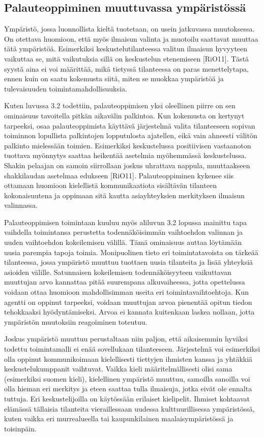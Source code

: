 \documentclass[finnish]{tktltiki2}
\theoremstyle{definition}
\theoremstyle{remark}
\begin{document}
\subsection{Palauteoppiminen muuttuvassa ympäristössä}

Ympäristö, jossa luonnollista kieltä tuotetaan, on usein jatkuvassa muutoksessa. On otettava huomioon, että myös ilmaisun valinta ja muotoilu saattavat muuttaa tätä ympäristöä. Esimerkiksi keskustelutilanteessa valitun ilmaisun hyvyyteen vaikuttaa se, mitä vaikutuksia sillä on keskustelun etenemiseen [RiO11]. Tästä syystä aina ei voi määrittää, mikä tietyssä tilanteessa on paras menettelytapa, ennen kuin on saatu kokemusta siitä, miten se muokkaa ympäristöä ja tulevaisuuden toimintamahdollisuuksia. 
 
Kuten luvussa 3.2 todettiin, palauteoppimisen yksi oleellinen piirre on sen ominaisuus tavoitella pitkän aikavälin palkintoa. Kun kokemusta on kertynyt tarpeeksi, osaa palauteoppimista käyttävä järjestelmä valita tilanteeseen sopivan toiminnon lopullista palkintojen lopputulosta ajatellen, eikä vain ahneesti välitön palkinto mielessään toimien. Esimerkiksi keskustelussa positiivisen vastaanoton tuottava myönnytys saattaa heikentää asetelmia myöhemmässä keskustelussa. Shakin pelaajan on samoin siirrollaan joskus uhrattava nappula, muuttaakseen shakkilaudan asetelmaa edukseen [RiO11]. Palauteoppiminen kykenee siis ottamaan huomioon kielellistä kommunikaatiota sisältävän tilanteen kokonaisuutena ja oppimaan sitä kautta asiayhteyksien merkityksen ilmaisun valinnassa. 
 
Palauteoppimisen toimintaan kuuluu myös aliluvun 3.2 lopussa mainittu tapa vaihdella toimintansa perustetta todennäköisimmän vaihtoehdon valinnan ja uuden vaihtoehdon kokeilemisen välillä. Tämä ominaisuus auttaa löytämään uusia parempia tapoja toimia. Monipuolinen tieto eri toimintatavoista on tärkeää tilanteessa, jossa ympäristö muuttuu tuottaen uusia tilanteita ja lisää yhteyksiä asioiden välille. Satunnaisen kokeilemisen todennäköisyyteen vaikuttavan muuttujan arvo kannattaa pitää suurempana alkuvaiheessa, jotta opettelussa voidaan ottaa huomioon mahdollisimman useita eri toimintavaihtoehtoja. Kun agentti on oppinut tarpeeksi, voidaan muuttujan arvoa pienentää opitun tiedon tehokkaaksi hyödyntämiseksi. Arvoa ei kannata kuitenkaan laskea nollaan, jotta ympäristön muutoksiin reagoiminen toteutuu. 
 
Joskus ympäristö muuttuu perustaltaan niin paljon, että aikaisemmin hyväksi todettu toimintamalli ei enää sovellukaan tilanteeseen. Järjestelmä voi esimerkiksi olla oppinut kommunikoimaan kielellisesti tiettyjen ihmisten kanssa ja yhtäkkiä keskustelukumppanit vaihtuvat. Vaikka kieli määritelmällisesti olisi sama (esimerkiksi suomen kieli), kielellinen ympäristö muuttuu, samoilla sanoilla voi olla hieman eri merkitys ja eteen saattaa tulla ilmaisuja, jotka eivät ole ennalta tuttuja. Eri keskustelijoilla on käytössään erilaiset kielipelit. Ihmiset kohtaavat elämässä tällaisia tilanteita vieraillessaan uudessa kulttuurillisessa ympäristössä, kuten vaikka eri murrealueella tai kaupunkilainen maalaisympäristössä ja toisinpäin. 
 
\end{document}
